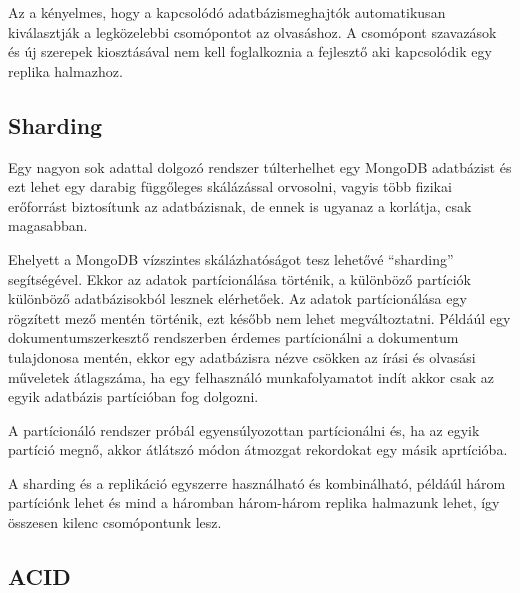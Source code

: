 Az a kényelmes, hogy a kapcsolódó adatbázismeghajtók automatikusan kiválasztják a legközelebbi csomópontot az olvasáshoz. A csomópont szavazások és új szerepek kiosztásával nem kell foglalkoznia a fejlesztő aki kapcsolódik egy replika halmazhoz. 

\subsection{Sharding}

Egy nagyon sok adattal dolgozó rendszer túlterhelhet egy MongoDB adatbázist és ezt lehet egy darabig függőleges skálázással orvosolni, vagyis több fizikai erőforrást biztosítunk az adatbázisnak, de ennek is ugyanaz a korlátja, csak magasabban. 

Ehelyett a MongoDB vízszintes skálázhatóságot tesz lehetővé ``sharding'' segítségével. Ekkor az adatok partícionálása történik, a különböző partíciók különböző adatbázisokból lesznek elérhetőek. Az adatok partícionálása egy rögzített mező mentén történik, ezt később nem lehet megváltoztatni. Példáúl egy dokumentumszerkesztő rendszerben érdemes partícionálni a dokumentum tulajdonosa mentén, ekkor egy adatbázisra nézve csökken az írási és olvasási műveletek átlagszáma, ha egy felhasználó munkafolyamatot indít akkor csak az egyik adatbázis partícióban fog dolgozni.

A partícionáló rendszer próbál egyensúlyozottan partícionálni és, ha az egyik partíció megnő, akkor átlátszó módon átmozgat rekordokat egy másik aprtícióba.

A sharding és a replikáció egyszerre használható és kombinálható, példáúl három partíciónk lehet és mind a háromban három-három replika halmazunk lehet, így összesen kilenc csomópontunk lesz.



\subsection{ACID}

